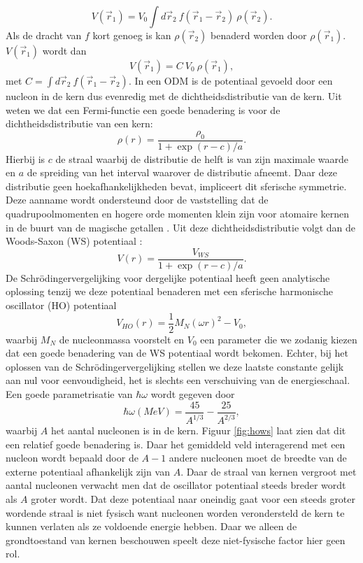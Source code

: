 \documentclass[11pt,twoside]{book}
\begin{document}
\begin{equation}
V(\vec{r}_1)  = V_0 \int d\vec{r}_2 \ f(\vec{r}_1 - \vec{r}_2) \ \rho (\vec{r}_2).
\end{equation}
Als de dracht van $f$ kort genoeg is kan $\rho (\vec{r}_2)$ benaderd worden door $\rho (\vec{r}_1)$. $V(\vec{r}_1)$ wordt dan
\begin{equation}
V(\vec{r}_1)  = C\  V_0  \ \rho (\vec{r}_1),
\end{equation} 
met $C = \int d\vec{r}_2\ f(\vec{r}_1-\vec{r}_2)$.
In een ODM  is de potentiaal gevoeld door een nucleon in de kern dus evenredig met de dichtheidsdistributie van de kern. Uit \cite{povh2008particles} weten we dat een Fermi-functie een goede benadering is voor de dichtheidsdistributie van een kern:
\begin{equation}
\rho (r) = \frac{\rho_0}{1+\exp{(r-c)/a}}.
\end{equation}
Hierbij is $c$ de straal waarbij de distributie de helft is van zijn maximale waarde en $a$ de spreiding van het interval waarover de distributie afneemt. Daar deze distributie geen hoekafhankelijkheden bevat, impliceert dit sferische symmetrie. Deze aanname wordt ondersteund door de vaststelling dat de quadrupoolmomenten en hogere orde momenten klein zijn voor atomaire kernen in de buurt van de magische getallen \cite{symmetry_shape}. 
Uit deze dichtheidsdistributie volgt dan de Woods-Saxon (WS) potentiaal \cite{povh2008particles}:
\begin{equation} \label{eq:ws_potential}
V(r)  = \frac{V_{WS}  }{1+\exp{(r-c)/a}}.
\end{equation}
De Schr\"{o}dingervergelijking voor dergelijke potentiaal heeft geen analytische oplossing tenzij we deze potentiaal benaderen met een sferische harmonische oscillator (HO) potentiaal 
\begin{equation} \label{eq:HO_potential}
V_{HO}(r) = \frac{1}{2} M_N (\omega r)^2- V_0,
\end{equation}
waarbij $M_N$ de nucleonmassa voorstelt en $V_0$ een parameter die we zodanig kiezen dat een goede benadering van de WS potentiaal wordt bekomen. Echter, bij het oplossen van de Schr\"{o}dingervergelijking stellen we deze laatste constante gelijk aan nul voor eenvoudigheid, het is slechts een verschuiving van de energieschaal. Een goede parametrisatie van $\hbar \omega$ \cite{maarten} wordt gegeven door
\begin{equation} \label{eq:omega}
\hbar\omega (MeV) = \frac{45}{A^{1/3}}-\frac{25}{A^{2/3}},
\end{equation}
waarbij $A$ het aantal nucleonen is in de kern. Figuur \ref{fig:hows} laat zien dat dit een relatief goede benadering is. Daar het gemiddeld veld interagerend met een nucleon wordt bepaald door de $A-1$ andere nucleonen moet de breedte van de externe potentiaal afhankelijk zijn van $A$. Daar de straal van kernen vergroot met aantal nucleonen verwacht men dat de oscillator potentiaal steeds breder wordt als $A$ groter wordt. Dat deze potentiaal naar oneindig gaat voor een steeds groter wordende straal is niet fysisch want nucleonen worden verondersteld de kern te kunnen verlaten als ze voldoende energie hebben. Daar we alleen de grondtoestand van kernen beschouwen speelt deze niet-fysische factor hier geen rol.
\end{document}
